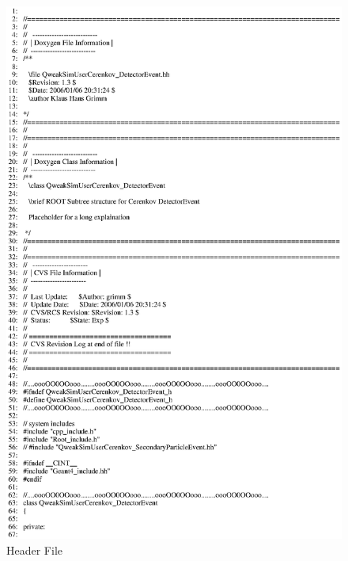 \begin{figure}[ht]
  \hspace{0cm}
  \includegraphics[scale=0.8]{./figures5/QweakSimUserCerenkov_DetectorEvent.hh-p1.eps}
  \caption{\label{SourceV31} Header File}
           \label{fig:V-SC-34}
\end{figure}

\clearpage

